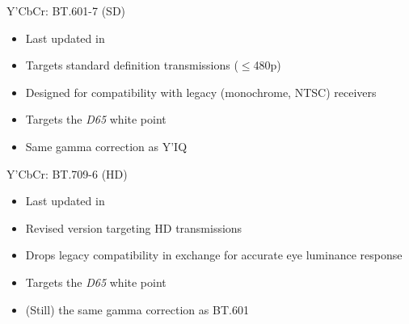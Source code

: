 \documentclass[aspectratio=169,usepdftitle=false]{fireshonks}
\begin{document}
\begin{frame}{Y'CbCr: BT.601-7 (SD)}
    \begin{itemize}
        \item Last updated in \cite*{BT601}
        \item Targets standard definition transmissions ($\leq$480p)
        \item Designed for compatibility with legacy (monochrome, NTSC) receivers
        \item Targets the \emph{D65} white point
        \item Same gamma correction as Y'IQ
    \end{itemize}

\end{frame}
\begin{frame}{Y'CbCr: BT.709-6 (HD)}
    \begin{itemize}
        \item Last updated in \cite*{BT709}
        \item Revised version targeting HD transmissions
        \item Drops legacy compatibility in exchange for accurate eye luminance response
        \item Targets the \emph{D65} white point
        \item (Still) the same gamma correction as BT.601
    \end{itemize}

\end{frame}
\end{document}
